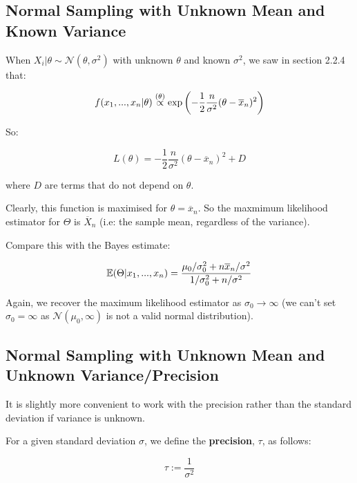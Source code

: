 \documentclass[a4paper]{article}
\begin{document}
        \subsection{Normal Sampling with Unknown Mean and Known Variance}
            When $X_i | \theta \sim \mathcal{N}(\theta, \sigma^2)$ with unknown
            $\theta$ and known $\sigma^2$, we saw in section 2.2.4 that:

            \[
                f(x_1, ..., x_n | \theta) \stackrel{({\theta})}{\propto} \exp\left(
                -\frac{1}{2}\frac{n}{\sigma^2} (\theta - \overline x_n)^2\right)
            \]

            So:

            \[
                L(\theta) = -\frac{1}{2}\frac{n}{\sigma^2}(\theta - \overline
                x_n)^2 + D
            \]

            where $D$ are terms that do not depend on $\theta$.

            Clearly, this function is maximised for $\widehat \theta = \overline
            x_n$. So the maxmimum likelihood estimator for $\Theta$ is
            $\overline X_n$ (i.e: the sample mean, regardless of the variance).

            Compare this with the Bayes estimate:

            \[
                \mathbb{E}(\Theta | x_1, ..., x_n) = \frac{\mu_0/\sigma_0^2 + n\overline
                x_n/\sigma^2}{1/\sigma_0^2 + n/\sigma^2}
            \]

            Again, we recover the maximum likelihood estimator as $\sigma_0 \to
            \infty$ (we can't set $\sigma_0 = \infty$ as $\mathcal{N}(\mu_0,
            \infty)$ is not a valid normal distribution).

        \subsection{Normal Sampling with Unknown Mean and Unknown
        Variance/Precision}
            It is slightly more convenient to work with the precision rather
            than the standard deviation if variance is unknown.

            \begin{definition}[Precision]
                For a given standard deviation $\sigma$, we define the
                \textbf{precision}, $\tau$, as follows:

                \[
                    \tau := \frac{1}{\sigma^2}
                \]
            \end{definition}
\end{document}
